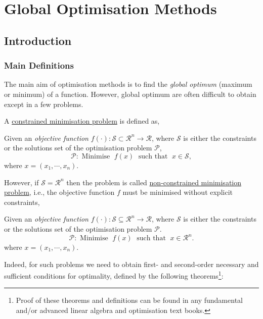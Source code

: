 
\chapter{Global Optimisation Methods}\label{Chapter:GlobalOpt}


\section{Introduction}\label{Chapter:GlobalOpt:Section:Introduction}

\subsection{Main Definitions}\label{Chapter:GlobalOpt:Section:Definitions}
The main aim of optimisation methods is to find the {\it global optimum} (maximum or minimum) of a function. However, global optimum are often difficult to obtain except in a few problems. 

A \underline{constrained minimisation problem} is defined as,
\begin{shaded}
   Given an {\it objective function} $f\left(\cdot\right):\mathcal{S}\subset\mathcal{R}^{n}\rightarrow\mathcal{R}$, where $\mathcal{S}$ is either the constraints or the solutions set of the optimisation problem $\mathcal{P}$,
\begin{displaymath}
   \mathcal{P}: \text{ Minimise }\; f(x)\; \text{ such that }\; x\in\mathcal{S}, 
\end{displaymath}
where $x=\left(x_{1},\cdots,x_{n}\right)$.
\end{shaded}

However, if $\mathcal{S}=\mathcal{R}^{n}$ then the problem is called  \underline{non-constrained minimisation problem}, i.e., the objective function $f$ must be minimised without explicit constraints,
\begin{shaded}
   Given an {\it objective function} $f\left(\cdot\right):\mathcal{S}\subseteq\mathcal{R}^{n}\rightarrow\mathcal{R}$, where $\mathcal{S}$ is either the constraints or the solutions set of the optimisation problem $\mathcal{P}$.
\begin{displaymath}
    \mathcal{P}: \text{ Minimise }\; f(x)\; \text{ such that }\; x\in\mathcal{R}^{n}. 
\end{displaymath}
where $x=\left(x_{1},\cdots,x_{n}\right)$.
\end{shaded}
Indeed, for such problems we need to obtain first- and second-order necessary and sufficient conditions for optimality, defined by the following theorems\footnote{Proof of these theorems and definitions can be found in any fundamental and/or advanced linear algebra and optimisation text books.}:

